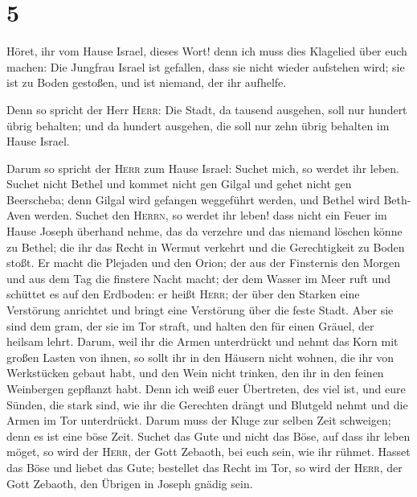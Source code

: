 \hypertarget{section-4}{%
\section{5}\label{section-4}}

 Höret, ihr vom Hause Israel, dieses Wort! denn ich muss
dies Klagelied über euch machen:  Die Jungfrau Israel ist
gefallen, dass sie nicht wieder aufstehen wird; sie ist zu Boden
gestoßen, und ist niemand, der ihr aufhelfe.

 Denn so spricht der Herr \textsc{Herr}: Die Stadt, da
tausend ausgehen, soll nur hundert übrig behalten; und da hundert
ausgehen, die soll nur zehn übrig behalten im Hause Israel.

 Darum so spricht der \textsc{Herr} zum Hause Israel:
Suchet mich, so werdet ihr leben.  Suchet nicht Bethel und
kommet nicht gen Gilgal und gehet nicht gen Beerscheba; denn Gilgal wird
gefangen weggeführt werden, und Bethel wird Beth-Aven werden.
 Suchet den \textsc{Herrn}, so werdet ihr leben! dass
nicht ein Feuer im Hause Joseph überhand nehme, das da verzehre und das
niemand löschen könne zu Bethel;  die ihr das Recht in
Wermut verkehrt und die Gerechtigkeit zu Boden stoßt.  Er
macht die Plejaden und den Orion; der aus der Finsternis den Morgen und
aus dem Tag die finstere Nacht macht; der dem Wasser im Meer ruft und
schüttet es auf den Erdboden: er heißt \textsc{Herr};  der
über den Starken eine Verstörung anrichtet und bringt eine Verstörung
über die feste Stadt.  Aber sie sind dem gram, der sie im
Tor straft, und halten den für einen Gräuel, der heilsam lehrt.
 Darum, weil ihr die Armen unterdrückt und nehmt das Korn
mit großen Lasten von ihnen, so sollt ihr in den Häusern nicht wohnen,
die ihr von Werkstücken gebaut habt, und den Wein nicht trinken, den ihr
in den feinen Weinbergen gepflanzt habt.  Denn ich weiß
euer Übertreten, des viel ist, und eure Sünden, die stark sind, wie ihr
die Gerechten drängt und Blutgeld nehmt und die Armen im Tor
unterdrückt.  Darum muss der Kluge zur selben Zeit
schweigen; denn es ist eine böse Zeit.  Suchet das Gute
und nicht das Böse, auf dass ihr leben möget, so wird der \textsc{Herr},
der Gott Zebaoth, bei euch sein, wie ihr rühmet.  Hasset
das Böse und liebet das Gute; bestellet das Recht im Tor, so wird der
\textsc{Herr}, der Gott Zebaoth, den Übrigen in Joseph gnädig sein.
